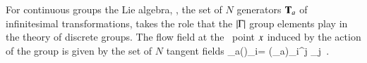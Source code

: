 For continuous groups the {Lie algebra}, \ie,
the set of $N$ generators $\mathbf{T}_a$ of infinitesimal
transformations, takes the role that the $|\Gamma|$ group
elements play in the theory of discrete groups. The flow field
at the \statesp\ point $x$ induced by the action of the group
is given by the set of $N$ tangent fields
\beq
\groupTan_a(\ssp)_{i}= (\Lg_a){}_{i}{}^j \ssp_j
\,.





